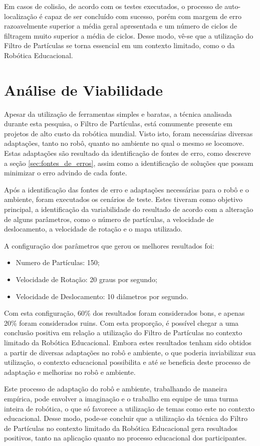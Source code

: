 Em casos de colisão, de acordo com os testes executados, o processo de auto-localização é capaz de ser concluído com sucesso, porém
com margem de erro razoavelmente superior a média geral apresentada e um número de ciclos de filtragem muito superior a média de ciclos. Desse modo,
vê-se que a utilização do Filtro de Partículas se torna essencial em um contexto limitado, como o da Robótica Educacional.

\section{Análise de Viabilidade}
\label{sec:viabilidade}

Apesar da utilização de ferramentas simples e baratas, a técnica analisada durante esta pesquisa, o Filtro de Partículas, está comumente
presente em projetos de alto custo da robótica mundial. Visto isto, foram necessárias diversas adaptações, tanto no robô, quanto no ambiente
no qual o mesmo se locomove. Estas adaptações são resultado da identificação de fontes de erro, como descreve a seção \ref{sec:fontes_de_erros},
assim como a identificação de soluções que possam minimizar o erro advindo de cada fonte.

Após a identificação das fontes de erro e adaptações necessárias para o robô e o ambiente, foram executados os cenários de teste. Estes tiveram como objetivo
principal, a identificação da variabilidade do resultado de acordo com a alteração de alguns parâmetros, como o número de partículas,
a velocidade de deslocamento, a velocidade de rotação e o mapa utilizado.

A configuração dos parâmetros que gerou os melhores resultados foi:

\begin{itemize}
  \item Numero de Partículas: 150;
  \item Velocidade de Rotação: 20 graus por segundo;
  \item Velocidade de Deslocamento: 10 diâmetros por segundo.
\end{itemize}

Com esta configuração, 60\% dos resultados foram considerados bons, e apenas 20\% foram considerados ruins. Com esta proporção, é possível
chegar a uma conclusão positiva em relação a utilização do Filtro de Partículas no contexto limitado da Robótica Educacional.
Embora estes resultados tenham sido obtidos a partir de diversas adaptações no robô e ambiente, o que poderia inviabilizar sua
utilização, o contexto educacional possibilita e até se beneficia deste processo de adaptação e melhorias no robô e ambiente.

Este processo de adaptação do robô e ambiente, trabalhando de maneira empírica, pode envolver a imaginação e o trabalho em equipe
de uma turma inteira de robótica, o que só favorece a utilização de temas como este no contexto educacional. Desse modo, pode-se concluir
que a utilização da técnica do Filtro de Partículas no contexto limitado da Robótica Educacional gera resultados positivos, tanto
na aplicação quanto no processo educacional dos participantes.
